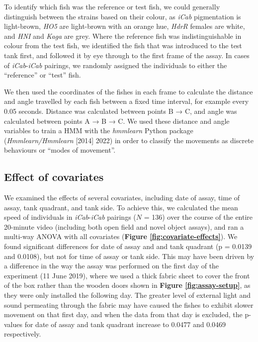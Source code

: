 \documentclass[
]{book}
\begin{document}
To identify which fish was the reference or test fish, we could generally distinguish between the strains based on their colour, as \emph{iCab} pigmentation is light-brown, \emph{HO5} are light-brown with an orange hue, \emph{HdrR} females are white, and \emph{HNI} and \emph{Kaga} are grey. Where the reference fish was indistinguishable in colour from the test fish, we identified the fish that was introduced to the test tank first, and followed it by eye through to the first frame of the assay. In cases of \emph{iCab}-\emph{iCab} pairings, we randomly assigned the individuals to either the ``reference'' or ``test'' fish.

We then used the coordinates of the fishes in each frame to calculate the distance and angle travelled by each fish between a fixed time interval, for example every 0.05 seconds. Distance was calculated between points B → C, and angle was calculated between points A → B → C. We used these distance and angle variables to train a HMM with the \emph{hmmlearn} Python package (\emph{Hmmlearn/Hmmlearn} {[}2014{]} 2022) in order to classify the movements as discrete behaviours or ``modes of movement''.

\hypertarget{effect-of-covariates}{%
\subsection{Effect of covariates}\label{effect-of-covariates}}

We examined the effects of several covariates, including date of assay, time of assay, tank quadrant, and tank side. To achieve this, we calculated the mean speed of individuals in \emph{iCab}-\emph{iCab} pairings (\(N\) = 136) over the course of the entire 20-minute video (including both open field and novel object assays), and ran a multi-way ANOVA with all covariates (\textbf{Figure \ref{fig:covariate-effects}}). We found significant differences for date of assay and and tank quadrant (p = 0.0139 and 0.0108), but not for time of assay or tank side. This may have been driven by a difference in the way the assay was performed on the first day of the experiment (11 June 2019), where we used a thick fabric sheet to cover the front of the box rather than the wooden doors shown in \textbf{Figure \ref{fig:assay-setup}}, as they were only installed the following day. The greater level of external light and sound permeating through the fabric may have caused the fishes to exhibit slower movement on that first day, and when the data from that day is excluded, the p-values for date of assay and tank quadrant increase to 0.0477 and 0.0469 respectively.
\end{document}
